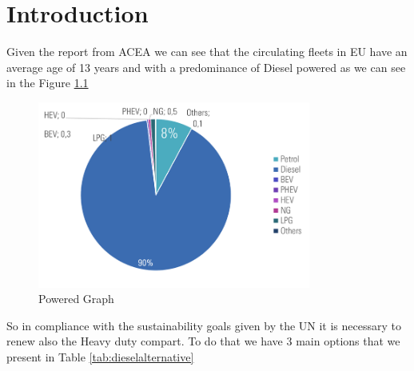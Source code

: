 \newpage
\chapter{Introduction}
Given the report from ACEA \cite{ACEA2021} we can see that the circulating fleets in EU have an average age of 13 years and with a predominance of Diesel powered as we can see in the Figure \ref{fig:hdpower}


\begin{figure}[h]
\centering
\includegraphics[width=0.8\textwidth]{Chapters/Pictures/grafico_diesel.png}
\caption{Powered Graph}
\label{fig:hdpower}
\end{figure}



So in compliance with the sustainability goals given by the UN it is necessary to renew also the Heavy duty compart. To do that we have 3 main options that we present in Table \ref{tab:dieselalternative}


